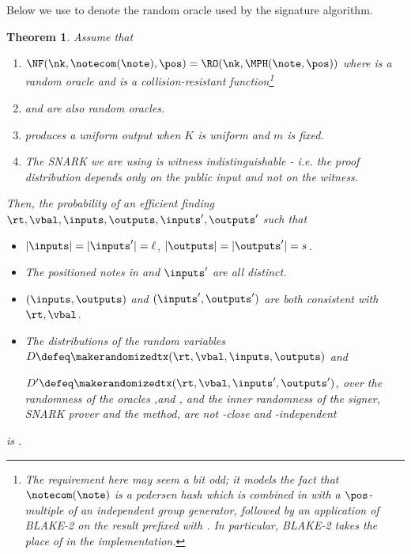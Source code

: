 \documentclass[11pt]{article}
\numberwithin{equation}{section} %
\numberwithin{figure}{section} %
\newtheorem{thm}{Theorem}[section]
\begin{document}
Below we use \ROsig to denote the random oracle used by the signature algorithm.
\begin{thm}\label{thm:indist-sapling}
Assume that 
\begin{enumerate}
 \item 
$\NF(\nk,\notecom(\note),\pos)= \RO(\nk,\MPH(\note,\pos))$ where \RO is a random oracle and \MPH is a collision-resistant function\footnote{The requirement here may seem a bit odd; it models the fact that $\notecom(\note)$ is a pedersen hash which is combined in \NF with a $\pos$-multiple of an independent group generator, followed by an application of BLAKE-2 on the result prefixed with \nk. In particular, BLAKE-2 takes the place of \RO in the implementation.}

\item
\KDF and \ROsig are also random oracles.
\item {} produces a uniform output when $K$ is uniform and $m$ is fixed.
\item The SNARK we are using is witness indistinguishable - i.e. the proof distribution depends \emph{only} on the public input and not on the witness.
\end{enumerate}


Then, the probability of an efficient \adv finding $\rt,\vbal,\inputs,\outputs,\inputs',\outputs'$
such that
\begin{itemize}
 \item 
$|\inputs|=|\inputs'| = \ell$, $|\outputs|=|\outputs'| =s $. 
\item The positioned notes in  and $\inputs'$ are all distinct.
\item $(\inputs,\outputs)$ and $(\inputs',\outputs')$ are both consistent with $\rt,\vbal$.
\item The distributions of the random variables $D\defeq \makerandomizedtx(\rt,\vbal,\inputs,\outputs)$ and 

$D'\defeq \makerandomizedtx(\rt,\vbal,\inputs',\outputs')$,
over the randomness of the oracles \RO,\KDF and \ROsig, and the inner randomness of the signer, SNARK prover and the \makerandomizedtx method,
are not \negl-close and \negl-independent
\end{itemize}
is \negl.

\end{thm}
\end{document}
